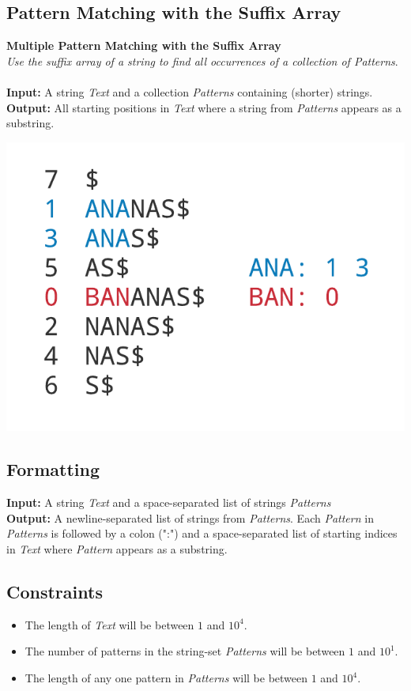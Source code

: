 \documentclass{article}
\begin{document}
\subsection{Pattern Matching with the Suffix Array}
\hline\vspace{5}
\textbf{Multiple Pattern Matching with the Suffix Array}\\
\emph{Use the suffix array of a string to find all occurrences of a collection of Patterns}.\\ \\
\textbf{Input:} A string \emph{Text} and a collection \emph{Patterns} containing (shorter) strings. \\
\textbf{Output:} All starting positions in \emph{Text} where a string from \emph{Patterns} appears as a substring.
\begin{center}
    \includegraphics[scale=0.2]{c9/logos/9H.png} 
\end{center}
\hline\vspace{5}

\subsection*{Formatting}
\textbf{Input:} A string \emph{Text} and a space-separated list of strings \emph{Patterns}\\
\noindent\textbf{Output:} A newline-separated list of strings from \emph{Patterns}. Each \emph{Pattern} in \emph{Patterns} is followed by a colon (":") and a space-separated list of starting indices in \emph{Text} where \emph{Pattern} appears as a substring.

\subsection*{Constraints}
\begin{itemize}
    \item The length of \emph{Text} will be between $1$ and $10^4$.
    \item The number of patterns in the string-set \emph{Patterns} will be between $1$ and $10^1$.
    \item The length of any one pattern in \emph{Patterns} will be between $1$ and $10^4$.
\end{itemize}
\pagebreak
\end{document}
